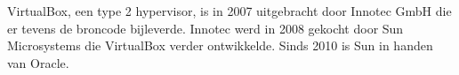 VirtualBox, een type 2 hypervisor, is in 2007 uitgebracht door Innotec GmbH die er tevens de broncode bijleverde. Innotec werd in 2008 gekocht door Sun Microsystems die VirtualBox verder ontwikkelde. Sinds 2010 is Sun in handen van Oracle.

